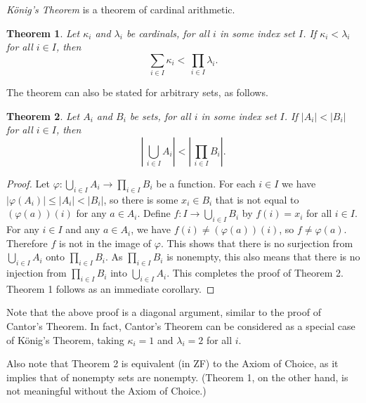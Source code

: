 \documentclass[12pt]{article}
\newtheorem{theorem}{Theorem}
\begin{document}

\emph{K\"onig's Theorem} is a theorem of cardinal arithmetic.

\begin{theorem}
Let $\kappa_i$ and $\lambda_i$ be cardinals, for all $i$ in some index set $I$.
If $\kappa_i<\lambda_i$ for all $i\in I$, then
$$\sum_{i\in I}\kappa_i<\,\prod_{i\in I}\lambda_i.$$
\end{theorem}

The theorem can also be stated for arbitrary sets, as follows.
\begin{theorem}
Let $A_i$ and $B_i$ be sets, for all $i$ in some index set $I$.
If $|A_i|<|B_i|$ for all $i\in I$, then
$$\left|\,\bigcup_{i\in I}A_i\right|<\left|\,\prod_{i\in I}B_i\right|.$$
\end{theorem}
\begin{proof}
Let $\varphi\colon\bigcup_{i\in I}A_i\to\prod_{i\in I}B_i$ be a function.
For each $i\in I$ we have $|\varphi(A_i)|\le|A_i|<|B_i|$,
so there is some $x_i\in B_i$ 
that is not equal to $(\varphi(a))(i)$  for any $a\in A_i$.
Define $f\colon I\to\bigcup_{i\in I}B_i$ 
by $f(i)=x_i$ for all $i\in I$.
For any $i\in I$ and any $a\in A_i$,
we have $f(i)\ne(\varphi(a))(i)$, so $f\ne\varphi(a)$.
Therefore $f$ is not in the image of $\varphi$.
This shows that there is 
no surjection from $\bigcup_{i\in I}A_i$ onto $\prod_{i\in I}B_i$.
As $\prod_{i\in I}B_i$ is nonempty,
this also means that
there is no injection from $\prod_{i\in I}B_i$ into $\bigcup_{i\in I}A_i$.
This completes the proof of Theorem 2. 
Theorem 1 follows as an immediate corollary.
\end{proof}

Note that the above proof is a diagonal argument, 
similar to the proof of Cantor's Theorem.
In fact, Cantor's Theorem can be considered as a special case of K\"onig's Theorem, taking $\kappa_i=1$ and $\lambda_i=2$ for all $i$.

Also note that Theorem 2 is equivalent (in ZF) to the Axiom of Choice, as it implies that  of nonempty sets are nonempty. (Theorem 1, on the other hand, is not meaningful without the Axiom of Choice.)
\end{document}
